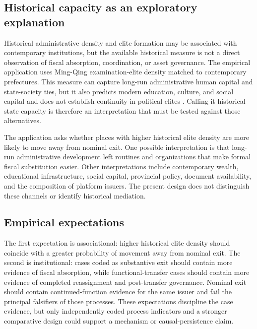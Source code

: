\subsection{Historical capacity as an exploratory explanation}

Historical administrative density and elite formation may be associated with
contemporary institutions, but the available historical measure is not a direct
observation of fiscal absorption, coordination, or asset governance. The
empirical application uses Ming-Qing examination-elite density matched to
contemporary prefectures. This measure can capture long-run administrative
human capital and state-society ties, but it also predicts modern education,
culture, and social capital and does not establish continuity in political
elites \citep{chen_kung_ma_2020_keju}. Calling it historical state capacity is
therefore an interpretation that must be tested against those alternatives.

The application asks whether places with higher historical elite density are
more likely to move away from nominal exit. One possible interpretation is that
long-run administrative development left routines and organizations that make
formal fiscal substitution easier. Other interpretations include contemporary
wealth, educational infrastructure, social capital, provincial policy,
document availability, and the composition of platform issuers. The present
design does not distinguish these channels or identify historical mediation.

\subsection{Empirical expectations}

The first expectation is associational: higher historical elite density should
coincide with a greater probability of movement away from nominal exit. The
second is institutional: cases coded as substantive exit should contain more
evidence of fiscal absorption, while functional-transfer cases should contain
more evidence of completed reassignment and post-transfer governance. Nominal
exit should contain continued-function evidence for the same issuer and fail
the principal falsifiers of those processes. These expectations discipline the
case evidence, but only independently coded process indicators and a stronger
comparative design could support a mechanism or causal-persistence claim.
